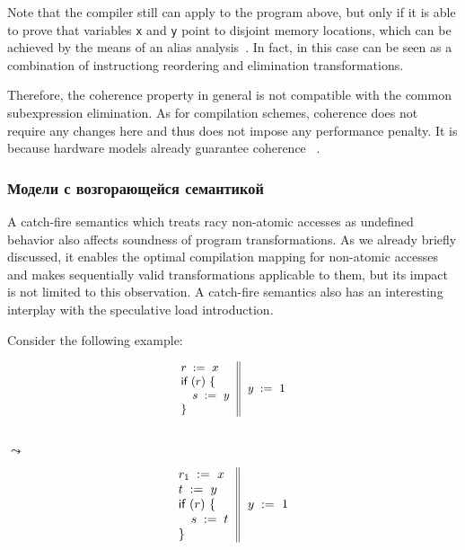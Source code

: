Note that the compiler still can apply \CSE to the program above, 
but only if it is able to prove that variables \texttt{x} and \texttt{y} 
point to disjoint memory locations, which can be achieved 
by the means of an alias analysis~\cite{Diwan-al:PLDI1998}.
In fact, in this case \CSE can be seen as a combination 
of instructiong reordering and elimination transformations.  

Therefore, the coherence property in general is not compatible 
with the common subexpression elimination.
As for compilation schemes, coherence does not require 
any changes here and thus does not impose any performance penalty.
It is because hardware models already guarantee coherence%
~\cite{Alglave-al:TOPLAS14, Sarkar-al:PLDI11, Sewell-al:CACM10, Lahav-al:PLDI17}. 

\subsubsection{Модели с возгорающейся семантикой}
\label{sec:analysis:ub}

A catch-fire semantics which treats racy non-atomic 
accesses as undefined behavior also affects  
soundness of program transformations. 
As we already briefly discussed, it enables 
the optimal compilation mapping for non-atomic accesses and 
makes sequentially valid transformations applicable 
to them, but its impact is not limited to this observation. 
A catch-fire semantics also has an interesting interplay
with the speculative load introduction.

Consider the following example:

\begin{minipage}{0.43\linewidth}
\begin{equation*}
\small
\inarrII{
  \readInst{}{r}{x}      \\
  \kw{if} {(r)} ~\{      \\
  \quad\readInst{}{s}{y} \\
  \}

}{
  \writeInst{}{y}{1}       \\
}
\label{ex:sliA}
\end{equation*}
\end{minipage}\hfill%
\begin{minipage}{0.09\linewidth}
\Large~\\ $\leadsto$
\end{minipage}\hfill%
\begin{minipage}{0.43\linewidth}
\begin{equation*}
\inarrII{
  \readInst{}{r_1}{x}      \\
  \readInst{}{t}{y}        \\
  \kw{if} {(r)} ~\{        \\
  \quad\assignInst{s}{t}   \\
  \}

}{
  \writeInst{}{y}{1}       \\
}
\label{ex:sliB}
\end{equation*}
\end{minipage}
 
